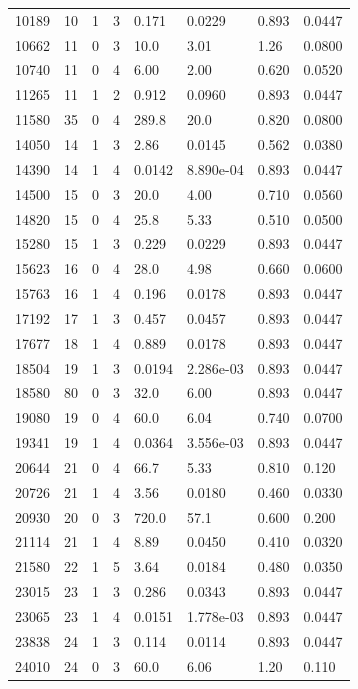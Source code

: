 \documentclass[preview]{standalone}
\begin{document}
{{\begin{tabular}{L{1.2cm}C{1.2cm} C{0.3cm}C{0.5cm} C{1.4cm}C{1.4cm} C{1.4cm}C{1.4cm}}
  10189  &    10  & 1     &  3 &  0.171  & 0.0229  & 0.893 &  0.0447   \\ 
  10662  &    11  & 0     &  3 &  10.0  & 3.01  & 1.26 &  0.0800   \\ 
  10740  &    11  & 0     &  4 &  6.00  & 2.00  & 0.620 &  0.0520   \\ 
  11265  &    11  & 1     &  2 &  0.912  & 0.0960  & 0.893 &  0.0447   \\ 
  11580  &    35  & 0     &  4 &  289.8  & 20.0  & 0.820 &  0.0800   \\ 
  14050  &    14  & 1     &  3 &  2.86  & 0.0145  & 0.562 &  0.0380   \\ 
  14390  &    14  & 1     &  4 &  0.0142  & 8.890e-04  & 0.893 &  0.0447   \\ 
  14500  &    15  & 0     &  3 &  20.0  & 4.00  & 0.710 &  0.0560   \\ 
  14820  &    15  & 0     &  4 &  25.8  & 5.33  & 0.510 &  0.0500   \\ 
  15280  &    15  & 1     &  3 &  0.229  & 0.0229  & 0.893 &  0.0447   \\ 
  15623  &    16  & 0     &  4 &  28.0  & 4.98  & 0.660 &  0.0600   \\ 
  15763  &    16  & 1     &  4 &  0.196  & 0.0178  & 0.893 &  0.0447   \\ 
  17192  &    17  & 1     &  3 &  0.457  & 0.0457  & 0.893 &  0.0447   \\ 
  17677  &    18  & 1     &  4 &  0.889  & 0.0178  & 0.893 &  0.0447   \\ 
  18504  &    19  & 1     &  3 &  0.0194  & 2.286e-03  & 0.893 &  0.0447   \\ 
  18580  &    80  & 0     &  3 &  32.0  & 6.00  & 0.893 &  0.0447   \\ 
  19080  &    19  & 0     &  4 &  60.0  & 6.04  & 0.740 &  0.0700   \\ 
  19341  &    19  & 1     &  4 &  0.0364  & 3.556e-03  & 0.893 &  0.0447   \\ 
  20644  &    21  & 0     &  4 &  66.7  & 5.33  & 0.810 &  0.120   \\ 
  20726  &    21  & 1     &  4 &  3.56  & 0.0180  & 0.460 &  0.0330   \\ 
  20930  &    20  & 0     &  3 &  720.0  & 57.1  & 0.600 &  0.200   \\ 
  21114  &    21  & 1     &  4 &  8.89  & 0.0450  & 0.410 &  0.0320   \\ 
  21580  &    22  & 1     &  5 &  3.64  & 0.0184  & 0.480 &  0.0350   \\ 
  23015  &    23  & 1     &  3 &  0.286  & 0.0343  & 0.893 &  0.0447   \\ 
  23065  &    23  & 1     &  4 &  0.0151  & 1.778e-03  & 0.893 &  0.0447   \\ 
  23838  &    24  & 1     &  3 &  0.114  & 0.0114  & 0.893 &  0.0447   \\ 
  24010  &    24  & 0     &  3 &  60.0  & 6.06  & 1.20 &  0.110   \\ 
\hline 
\end{tabular} 

}}
\end{document}
